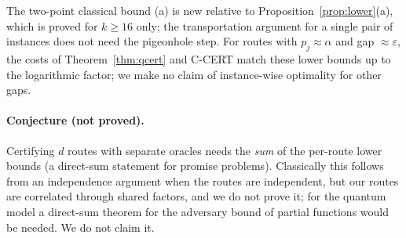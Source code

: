 \begin{remark}
The two-point classical bound (a) is new relative to Proposition~\ref{prop:lower}(a), which is proved for $k\ge16$ only; the transportation argument for a single pair of instances does not need the pigeonhole step. For routes with $p_j\approx\alpha$ and gap $\approx\varepsilon$, the costs of Theorem~\ref{thm:qcert} and C-CERT match these lower bounds up to the logarithmic factor; we make no claim of instance-wise optimality for other gaps.
\end{remark}

\paragraph{Conjecture (not proved).} Certifying $d$ routes with separate oracles needs the \emph{sum} of the per-route lower bounds (a direct-sum statement for promise problems). Classically this follows from an independence argument when the routes are independent, but our routes are correlated through shared factors, and we do not prove it; for the quantum model a direct-sum theorem for the adversary bound of partial functions would be needed. We do not claim it.
